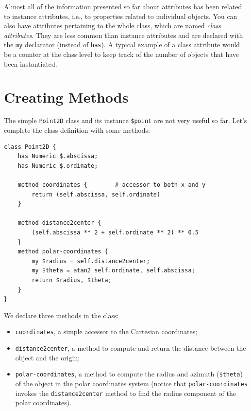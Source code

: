 Almost all of the information presented so far about attributes 
has been related to instance attributes, i.e., to properties related to 
individual objects. You can also have attributes pertaining 
to the whole class, which are named \emph{class attributes}. 
They are less common than instance attributes and are declared 
with the {\tt my} declarator (instead of {\tt has}). A typical 
example of a class attribute would be a counter at the class level 
to keep track of the number of objects that have been 
instantiated. 


\section{Creating Methods}

The simple {\tt Point2D} class and its instance \verb'$point' 
are not very useful so far. Let's complete the class definition 
with some methods:

\begin{verbatim}
class Point2D {
    has Numeric $.abscissa;
    has Numeric $.ordinate;
    
    method coordinates {        # accessor to both x and y
        return (self.abscissa, self.ordinate)
    }
    
    method distance2center {
        (self.abscissa ** 2 + self.ordinate ** 2) ** 0.5
    }
    method polar-coordinates {
        my $radius = self.distance2center;
        my $theta = atan2 self.ordinate, self.abscissa;
        return $radius, $theta;
    }
}
\end{verbatim}

We declare three methods in the class:
\begin{itemize}
\item {\tt coordinates}, a simple accessor to the Cartesian 
coordinates;

\item{\tt distance2center}, a method to compute and return 
the distance between the object and the origin;

\item{\tt polar-coordinates}, a method to compute the radius 
and azimuth (\verb'$theta') of the object in the polar 
coordinates system (notice that {\tt polar-coordinates} 
invokes the {\tt distance2center} method to find the radius 
component of the polar coordinates).
\end{itemize}


